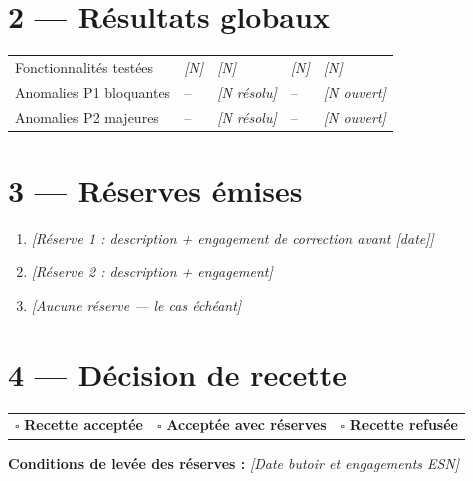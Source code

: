 \documentclass[11pt,a4paper,oneside]{report}
\begin{document}
\section*{2 — Résultats globaux}

\renewcommand{\arraystretch}{1.3}
\begin{tabularx}{\textwidth}{L{4cm} C{2cm} C{2cm} C{2cm} Y}
\toprule
{} &  &  &  &  \\
\midrule
Fonctionnalités testées & \textit{[N]} & \textit{[N]} & \textit{[N]} & \textit{[N]} \\
Anomalies P1 bloquantes & -- & \textit{[N résolu]} & -- & \textit{[N ouvert]} \\
Anomalies P2 majeures   & -- & \textit{[N résolu]} & -- & \textit{[N ouvert]} \\
\bottomrule
\end{tabularx}

\section*{3 — Réserves émises}

\begin{enumerate}
  \item \textit{[Réserve 1 : description + engagement de correction avant \textit{[date]}]}
  \item \textit{[Réserve 2 : description + engagement]}
  \item \textit{[Aucune réserve — le cas échéant]}
\end{enumerate}

\section*{4 — Décision de recette}

\begin{tcolorbox}[
  colback=cnLightBlue, colframe=cnNavy,
  leftrule=4pt, rightrule=0pt, toprule=0pt, bottomrule=0pt,
  arc=0pt, boxsep=6pt, top=6pt, bottom=6pt, left=6pt, right=6pt]

\renewcommand{\arraystretch}{1.5}
\begin{tabularx}{\textwidth}{ccc}
\cellcolor{cnGreen!25}\large $\square$ \textbf{Recette acceptée}
& \cellcolor{cnOrange!25}\large $\square$ \textbf{Acceptée avec réserves}
& \cellcolor{cnRed!25}\large $\square$ \textbf{Recette refusée} \\
\end{tabularx}

\vspace{6pt}
\textbf{Conditions de levée des réserves :} \textit{[Date butoir et engagements ESN]}

\end{tcolorbox}
\end{document}
